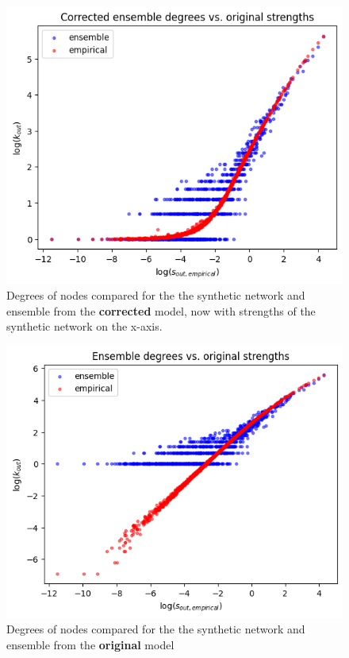 \documentclass{article}
\begin{document}
\begin{figure}[!ht]
    \centering
    \includegraphics[scale=0.4]{img/metropolis/corrected model/dg_vs_s.png}
    \caption{Degrees of nodes compared for the the synthetic network and ensemble from the \textbf{corrected} model, now with strengths of the synthetic network on the x-axis.}
\end{figure}\begin{figure}[!ht]
    \centering
    \includegraphics[scale=0.4]{img/metropolis/vanilla model/dg_vs_s.png}
    \caption{Degrees of nodes compared for the the synthetic network and ensemble from the \textbf{original} model}
\end{figure}
\end{document}
